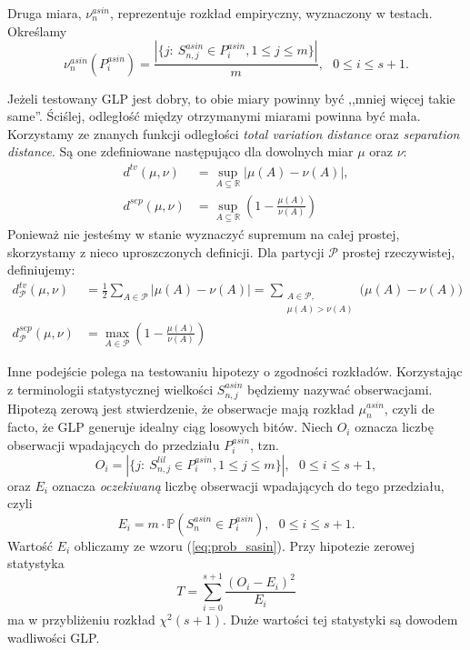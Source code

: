 \documentclass[a4paper,11pt,twoside]{book}
\newcommand{\Pro}[1]{\mathbb{P}\left(#1\right)}
\newcommand{\Slil}[1]{S^{lil}_#1}
\newcommand{\Sasin}[1]{S^{asin}_#1}
\theoremstyle{definition}
\begin{document}
Druga miara, $\nu^{asin}_n$,  reprezentuje rozkład empiryczny, wyznaczony w testach. Określamy
\begin{equation}
 \label{eq:emp_asin}
 \nu^{asin}_n \left( P^{asin}_i \right) = \frac{|\{ j:\ \Sasin{{n,j}} \in  P^{asin}_i, 1 \leq j \leq m\}|}{m},\ \ \ 0 \leq i \leq s+1.
\end{equation}


Jeżeli testowany GLP jest dobry, to obie miary powinny być ,,mniej więcej takie same''. Ściślej, odległość między otrzymanymi miarami powinna być mała. Korzystamy ze znanych funkcji odległości \textit{total variation distance} oraz \textit{separation distance}. Są one zdefiniowane następująco dla dowolnych miar $\mu$ oraz $\nu$:
\begin{align}
 d^{tv}(\mu, \nu) &= \sup_{A \subseteq \mathbb{R}} |\mu(A) - \nu(A)|,\\
 d^{sep}(\mu, \nu) &= \sup_{A \subseteq \mathbb{R}} \left(1 - \frac{\mu(A)}{\nu(A)}\right)
\end{align}
Ponieważ nie jesteśmy w stanie wyznaczyć supremum na całej prostej, skorzystamy z nieco uproszczonych definicji. Dla partycji $\mathcal{P}$ prostej rzeczywistej, definiujemy:
\begin{align}
 d^{tv}_\mathcal{P}(\mu, \nu) &= \frac{1}{2} \sum_{A \in \mathcal{P}} |\mu(A) - \nu(A)|
    = \sum_{\substack{A \in \mathcal{P},\\ \mu(A) >\nu(A)}} \Big(\mu(A) - \nu(A)\Big)\\
 d^{sep}_\mathcal{P}(\mu, \nu) &= \max_{A \in \mathcal{P}}\left(1 - \frac{\mu(A)}{\nu(A)}\right)
\end{align}

Inne podejście polega na testowaniu hipotezy o zgodności rozkładów. Korzystając z terminologii statystycznej wielkości $\Sasin{{n,j}}$ będziemy nazywać obserwacjami. Hipotezą zerową jest stwierdzenie, że obserwacje mają rozkład $\mu^{asin}_n$, czyli de facto, że GLP generuje idealny ciąg losowych bitów. Niech $O_i$ oznacza liczbę obserwacji wpadających do przedziału $P^{asin}_i$, tzn.
\begin{equation}
 O_i = |\{ j:\ \Slil{{n,j}} \in  P^{asin}_i, 1 \leq j \leq m\}|,\ \ \ 0 \leq i \leq s+1,
\end{equation}
oraz $E_i$ oznacza \textit{oczekiwaną} liczbę obserwacji wpadających do tego przedziału, czyli
\begin{equation}
 E_i = m \cdot \Pro{\Sasin{n} \in P^{asin}_i},\ \ \ 0 \leq i \leq s+1.
\end{equation}
Wartość $E_i$ obliczamy ze wzoru (\ref{eq:prob_sasin}). Przy hipotezie zerowej statystyka
\begin{equation}
\label{eq:chi_asin}
 T = \sum_{i=0}^{s+1} \frac{(O_i - E_i)^2}{E_i}
\end{equation}
ma w przybliżeniu rozkład $\chi^2(s+1)$. Duże wartości tej statystyki są dowodem wadliwości GLP.
\end{document}
